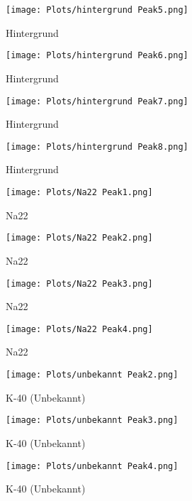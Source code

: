 \documentclass[]{article}
\begin{document}
 
 \begin{figure}
 	\centering
 	\texttt{[image: Plots/hintergrund Peak5.png]}
 	\caption{Hintergrund}
 \end{figure}
 
 
 \begin{figure}
 	\centering
 	\texttt{[image: Plots/hintergrund Peak6.png]}
 	\caption{Hintergrund}
 \end{figure}
 
 
 \begin{figure}
 	\centering
 	\texttt{[image: Plots/hintergrund Peak7.png]}
 	\caption{Hintergrund}
 \end{figure}
 
 \newpage
 \begin{figure}
 	\centering
 	\texttt{[image: Plots/hintergrund Peak8.png]}
 	\caption{Hintergrund}
 \end{figure}
 
 \begin{figure}
 	\centering
 	\texttt{[image: Plots/Na22 Peak1.png]}
 	\caption{Na22}
 \end{figure}
 
  \begin{figure}
 	\centering
 	\texttt{[image: Plots/Na22 Peak2.png]}
 	\caption{Na22}
 \end{figure}
 
  \begin{figure}
 	\centering
 	\texttt{[image: Plots/Na22 Peak3.png]}
 	\caption{Na22}
 \end{figure}
 
  \begin{figure}
 	\centering
 	\texttt{[image: Plots/Na22 Peak4.png]}
 	\caption{Na22}
 \end{figure}
 
 
 \begin{figure}
 	\centering
 	\texttt{[image: Plots/unbekannt Peak2.png]}
 	\caption{K-40 (Unbekannt)}
 \end{figure}
 

 \begin{figure}
	\centering
	\texttt{[image: Plots/unbekannt Peak3.png]}
	\caption{K-40 (Unbekannt)}
\end{figure}

 \begin{figure}
	\centering
	\texttt{[image: Plots/unbekannt Peak4.png]}
	\caption{K-40 (Unbekannt)}
\end{figure}
\end{document}
